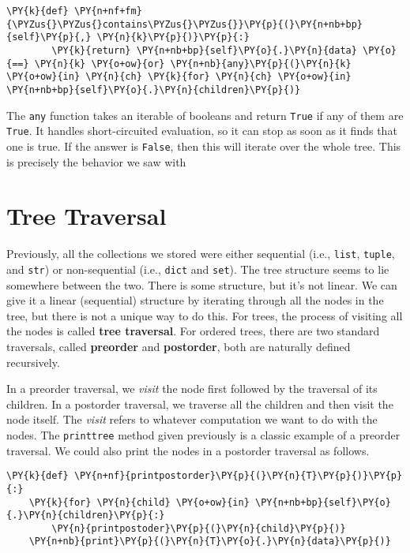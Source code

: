 \begin{Verbatim}[commandchars=\\\{\}]
    \PY{k}{def} \PY{n+nf+fm}{\PYZus{}\PYZus{}contains\PYZus{}\PYZus{}}\PY{p}{(}\PY{n+nb+bp}{self}\PY{p}{,} \PY{n}{k}\PY{p}{)}\PY{p}{:}
        \PY{k}{return} \PY{n+nb+bp}{self}\PY{o}{.}\PY{n}{data} \PY{o}{==} \PY{n}{k} \PY{o+ow}{or} \PY{n+nb}{any}\PY{p}{(}\PY{n}{k} \PY{o+ow}{in} \PY{n}{ch} \PY{k}{for} \PY{n}{ch} \PY{o+ow}{in} \PY{n+nb+bp}{self}\PY{o}{.}\PY{n}{children}\PY{p}{)}
\end{Verbatim}



The \texttt{any} function takes an iterable of booleans and return \texttt{True} if any of them are \texttt{True}.
It handles short-circuited evaluation, so it can stop as soon as it finds that one is true.
If the answer is \texttt{False}, then this will iterate over the whole tree.
This is precisely the behavior we saw with

\section{Tree Traversal}


Previously, all the collections we stored were either sequential (i.e., \texttt{list}, \texttt{tuple}, and \texttt{str}) or non-sequential (i.e., \texttt{dict} and \texttt{set}).  The tree structure seems to lie somewhere between the two.
There is some structure, but it's not linear.
We can give it a linear (sequential) structure by iterating through all the nodes in the tree, but there is not a unique way to do this.
For trees, the process of visiting all the nodes is called \textbf{tree traversal}.
For ordered trees, there are two standard traversals, called \textbf{preorder} and \textbf{postorder}, both are naturally defined recursively.


In a preorder traversal, we \emph{visit} the node first followed by the traversal of its children.
In a postorder traversal, we traverse all the children and then visit the node itself.
The \emph{visit} refers to whatever computation we want to do with the nodes.
The \texttt{printtree} method given previously is a classic example of a preorder traversal.
We could also print the nodes in a postorder traversal as follows.

\begin{Verbatim}[commandchars=\\\{\}]
\PY{k}{def} \PY{n+nf}{printpostorder}\PY{p}{(}\PY{n}{T}\PY{p}{)}\PY{p}{:}
    \PY{k}{for} \PY{n}{child} \PY{o+ow}{in} \PY{n+nb+bp}{self}\PY{o}{.}\PY{n}{children}\PY{p}{:}
        \PY{n}{printpostoder}\PY{p}{(}\PY{n}{child}\PY{p}{)}
    \PY{n+nb}{print}\PY{p}{(}\PY{n}{T}\PY{o}{.}\PY{n}{data}\PY{p}{)}
\end{Verbatim}



